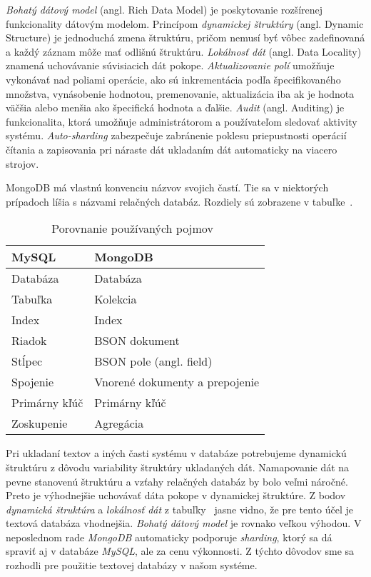 \textit{Bohatý dátový model} (angl. Rich Data Model) je poskytovanie rozšírenej funkcionality dátovým modelom. Princípom \textit{dynamickej štruktúry} (angl. Dynamic Structure) je jednoduchá zmena štruktúru, pričom nemusí byť vôbec zadefinovaná a každý záznam môže mať odlišnú štruktúru. \textit{Lokálnosť dát} (angl. Data Locality) znamená uchovávanie súvisiacich dát pokope. \textit{Aktualizovanie polí} umožňuje vykonávať nad poliami operácie, ako sú inkrementácia podľa špecifikovaného množstva, vynásobenie hodnotou, premenovanie, aktualizácia iba ak je hodnota väčšia alebo menšia ako špecifická hodnota a ďalšie. \textit{Audit} (angl. Auditing) je funkcionalita, ktorá umožňuje administrátorom a používateľom sledovať aktivity systému. \textit{Auto-sharding} zabezpečuje zabránenie poklesu priepustnosti operácií čítania a zapisovania pri náraste dát ukladaním dát automaticky na viacero strojov.

MongoDB má vlastnú konvenciu názvov svojich častí. Tie sa v niektorých prípadoch líšia s názvami relačných databáz. Rozdiely sú zobrazene v tabuľke~.

\begin{table}[H]
	\centering
	\caption[Porovnanie používaných pojmov]{Porovnanie používaných pojmov~\cite{MongoDBvsMySQL2015}}
	\label{table:names_of_mongodb}
	\begin{tabular}{|l|l|}
		\hline
		\textbf{MySQL} & \textbf{MongoDB} \\ \hline
		Databáza & Databáza \\ \hline
		Tabuľka & Kolekcia \\ \hline
		Index & Index \\ \hline
		Riadok & BSON dokument \\ \hline
		Stĺpec & BSON pole (angl. field) \\ \hline
		Spojenie & Vnorené dokumenty a prepojenie \\ \hline
		Primárny kľúč & Primárny kľúč \\ \hline
		Zoskupenie & Agregácia \\ \hline
	\end{tabular}
\end{table}

Pri ukladaní textov a iných časti systému v databáze potrebujeme dynamickú štruktúru z dôvodu variability štruktúry ukladaných dát. Namapovanie dát na pevne stanovenú štruktúru a vzťahy relačných databáz by bolo veľmi náročné. Preto je výhodnejšie uchovávať dáta pokope v dynamickej štruktúre. Z bodov \textit{dynamická štruktúra} a \textit{lokálnosť dát} z tabuľky~ jasne vidno, že pre tento účel je textová databáza vhodnejšia. \textit{Bohatý dátový model} je rovnako veľkou výhodou. V neposlednom rade \textit{MongoDB} automaticky podporuje \textit{sharding}, ktorý sa dá spraviť aj v databáze \textit{MySQL}, ale za cenu výkonnosti. Z týchto dôvodov sme sa rozhodli pre použitie textovej databázy v našom systéme.

